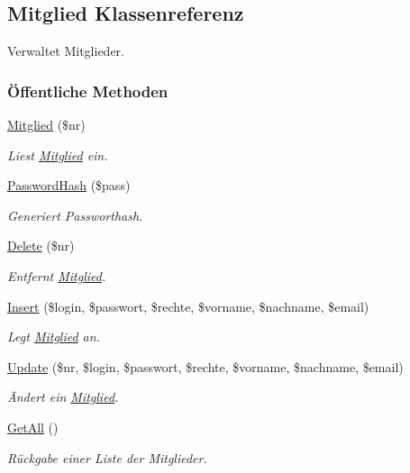 \hypertarget{classMitglied}{
\subsection{Mitglied Klassenreferenz}
\label{classMitglied}
}
Verwaltet Mitglieder.  


\subsubsection*{\"{O}ffentliche Methoden}
\begin{CompactItemize}
\item 
\hyperlink{classMitglied_0ee18db6476bcb6d71d30978eb69c7ae}{Mitglied} (\$nr)
\begin{CompactList}\small\item\em Liest \hyperlink{classMitglied}{Mitglied} ein. \item\end{CompactList}\item 
\hyperlink{classMitglied_9b13db80866c22bf992e73f2eb75e369}{Password\-Hash} (\$pass)
\begin{CompactList}\small\item\em Generiert Passworthash. \item\end{CompactList}\item 
\hyperlink{classMitglied_c6900c12663e9b228bf9942fc045b8b4}{Delete} (\$nr)
\begin{CompactList}\small\item\em Entfernt \hyperlink{classMitglied}{Mitglied}. \item\end{CompactList}\item 
\hyperlink{classMitglied_a856527798258505adf9eb08b79fd9fc}{Insert} (\$login, \$passwort, \$rechte, \$vorname, \$nachname, \$email)
\begin{CompactList}\small\item\em Legt \hyperlink{classMitglied}{Mitglied} an. \item\end{CompactList}\item 
\hyperlink{classMitglied_0d173487bebdd0579a70ea007b37b5ec}{Update} (\$nr, \$login, \$passwort, \$rechte, \$vorname, \$nachname, \$email)
\begin{CompactList}\small\item\em Ändert ein \hyperlink{classMitglied}{Mitglied}. \item\end{CompactList}\item 
\hyperlink{classMitglied_70ce63c9c9a7159966dc9e80a7f726a2}{Get\-All} ()
\begin{CompactList}\small\item\em Rückgabe einer Liste der Mitglieder. \item\end{CompactList}\end{CompactItemize}
